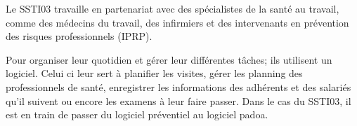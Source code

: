 Le SSTI03 travaille en partenariat avec des spécialistes de la santé au travail, comme des médecins du travail, des infirmiers et des intervenants en prévention des risques professionnels (IPRP).

Pour organiser leur quotidien et gérer leur différentes tâches; ils utilisent un logiciel. Celui ci leur sert à planifier les visites, gérer les planning des professionnels de santé, enregistrer les informations des adhérents et des salariés qu'il suivent ou encore les examens à leur faire passer. Dans le cas du SSTI03, il est en train de passer du logiciel préventiel au logiciel padoa. 

